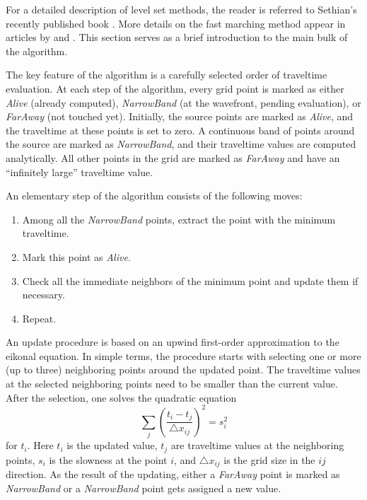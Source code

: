 For a detailed description of level set methods, the reader is
referred to Sethian's recently published book \cite[]{book}. More
details on the fast marching method appear in articles by
\cite{paper2} and \cite{mihai}. This section serves as a brief
introduction to the main bulk of the algorithm.
\par
The key feature of the algorithm is a carefully selected order of
traveltime evaluation. At each step of the algorithm, every grid point
is marked as either \emph{Alive} (already computed), \emph{NarrowBand}
(at the wavefront, pending evaluation), or \emph{FarAway} (not touched
yet). Initially, the source points are marked as \emph{Alive}, and the
traveltime at these points is set to zero. A continuous band of points
around the source are marked as \emph{NarrowBand}, and their
traveltime values are computed analytically. All other points in the
grid are marked as \emph{FarAway} and have an ``infinitely large''
traveltime value.
\par
An elementary step of the algorithm consists of the following
moves:
 \begin{enumerate}
 \item Among all the \emph{NarrowBand} points, extract the point with
 the minimum traveltime.
 \item Mark this point as \emph{Alive}.
 \item Check all the immediate neighbors of the minimum point and
 update them if necessary.
 \item Repeat.
 \end{enumerate}
\par
An update procedure is based on an upwind first-order approximation to
the eikonal equation. In simple terms, the procedure starts with
selecting one or more (up to three) neighboring points around the
updated point. The traveltime values at the selected neighboring
points need to be smaller than the current value. After the selection,
one solves the quadratic equation
\begin{equation}
\label{eqn:update}
\sum_{j} \left(\frac{t_i-t_j}{\triangle x_{ij}}\right)^2 = s_i^2
\end{equation}
for $t_i$. Here $t_i$ is the updated value, $t_j$ are traveltime
values at the neighboring points, $s_i$ is the slowness at the point
$i$, and $\triangle x_{ij}$ is the grid size in the $ij$ direction.
As the result of the updating, either a \emph{FarAway} point is marked
as \emph{NarrowBand} or a \emph{NarrowBand} point gets assigned a new
value.
\par
